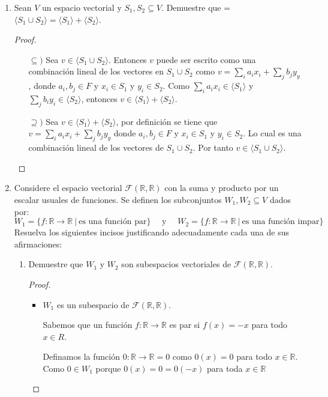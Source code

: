 \documentclass[11pt,letterpaper]{article}
\newcommand{\R}{\mathbb{R}}
\begin{document}
\begin{enumerate}
\item Sean $V$ un espacio vectorial y $S_1, S_2 \subseteq V$.
Demuestre que = $\langle S_1 \cup S_2 \rangle = \langle S_1 \rangle + \langle S_2 \rangle$.
\begin{proof}\hfill
\begin{enumerate}
    \item[$\subseteq)$] Sea $v \in \langle S_1 \cup S_2 \rangle$. Entonces $v$ puede ser escrito
    como una combinación lineal de los vectores en $S_1 \cup S_2$ como
    $v = \sum_i a_i x_i + \sum_j b_j y_y$, donde $a_i, b_j \in F$ y $x_i \in S_1$ y $y_i \in S_2$.
    Como $\sum_i a_i x_i \in \langle S_1 \rangle$ y $\sum_j b_i y_i \in \langle S_2 \rangle$,
    entonces $v \in \langle S_1 \rangle + \langle S_2 \rangle$.

    \item[$\supseteq)$] Sea $v \in \langle S_1 \rangle + \langle S_2 \rangle$, por definición
    se tiene que $v = \sum_i a_i x_i + \sum_j b_j y_y$ donde $a_i, b_j \in F$ y $x_i \in S_1$
    y $y_i \in S_2$. Lo cual es una combinación lineal de los vectores de $S_1 \cup S_2$.
    Por tanto $v \in \langle S_1 \cup S_2 \rangle$.
    
\end{enumerate}
\end{proof}

\item Considere el espacio vectorial $\mathscr{F} (\R, \R)$ con la suma y producto por un escalar
usuales de funciones. Se definen los subconjuntos $W_1, W_2 \subseteq V$ dados por:
\[
    W_1 = \{ f : \R \to \R \ | \ \text{es una función par} \} \quad \text{ y } \quad
    W_2 = \{ f : \R \to \R \ | \ \text{es una función impar} \}
\]
Resuelva los siguientes incisos justificando adecuadamente cada una de sus afirmaciones:
\begin{enumerate}[label=(\alph*)]
    \item Demuestre que $W_1$ y $W_2$ son subespacios vectoriales de $\mathscr{F} (\R, \R)$.
    \begin{proof}\hfill
    \begin{itemize}
        \item $W_1$ es un subespacio de $\mathscr{F} (\R, \R)$.
        
        Sabemos que un función $f: \R \to \R$ es par si $f(x) = -x$ para todo $x \in R$.

        Definamos la función $0: \R \to \R = 0$ como $0(x) = 0$ para todo $x \in \R$. Como $0 \in W_1$
        porque $0(x) = 0 = 0(-x)$ para toda $x \in \R$


\end{itemize}
\end{proof}
\end{enumerate}
\end{enumerate}
\end{document}
